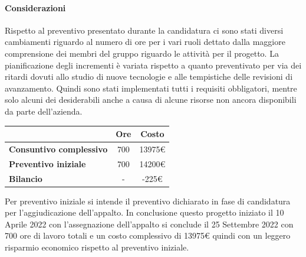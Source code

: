 \paragraph{Considerazioni} \hfill \break
Rispetto al preventivo presentato durante la candidatura ci sono stati diversi cambiamenti riguardo al numero di ore per i vari ruoli dettato dalla maggiore comprensione dei membri del gruppo riguardo le attività per il progetto. 
La pianificazione degli incrementi è variata rispetto a quanto preventivato per via dei ritardi dovuti allo studio di nuove tecnologie e alle tempistiche delle revisioni di avanzamento. 
Quindi sono stati implementati tutti i requisiti obbligatori, mentre solo alcuni dei desiderabili anche a causa di alcune risorse non ancora disponibili da parte dell'azienda.
\begin{center}
	\renewcommand{\arraystretch}{1.8}
	\begin{tabular}{ | l |c|c| }
    \hline
    & \textbf{Ore} & \textbf{Costo} \\
    \hline
    \textbf{Consuntivo complessivo} & 700 & 13975\euro \\
    \hline
    \textbf{Preventivo iniziale} & 700 & 14200\euro \\
    \hline
    \textbf{Bilancio} & - & -225\euro \\
    \hline
    \end{tabular}
\end{center}
Per preventivo iniziale si intende il preventivo dichiarato in fase di candidatura per l'aggiudicazione dell'appalto.
In conclusione questo progetto iniziato il 10 Aprile 2022 con l'assegnazione dell'appalto si conclude il 25 Settembre 2022 con 700 ore di lavoro totali e un costo complessivo di 13975€ quindi con un leggero risparmio economico rispetto al preventivo iniziale.